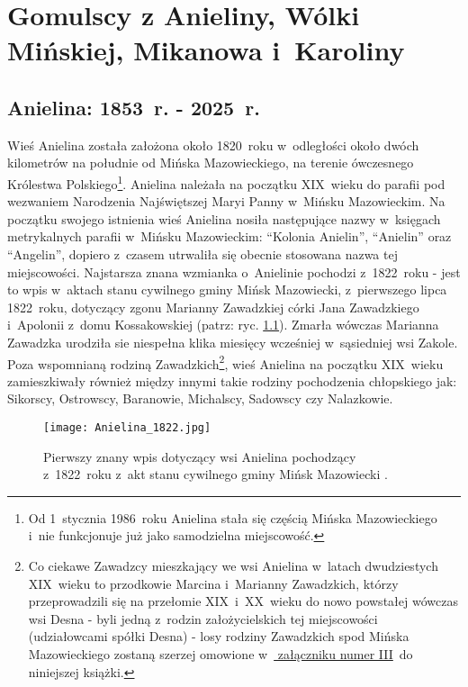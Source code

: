 \chapter{Gomulscy z Anieliny, Wólki Mińskiej, Mikanowa i~Karoliny}



\section{Anielina: 1853~r. - 2025~r.}

Wieś Anielina została założona około 1820~roku w~odległości około dwóch 
kilometrów na południe od Mińska Mazowieckiego, na terenie ówczesnego 
Królestwa Polskiego\footnote{Od 1~stycznia 1986~roku Anielina stała się 
częścią Mińska Mazowieckiego i~nie funkcjonuje już jako samodzielna 
miejscowość.}. Anielina należała na początku XIX~wieku do parafii pod 
wezwaniem Narodzenia Najświętszej Maryi Panny w~Mińsku Mazowieckim. Na 
początku swojego istnienia wieś Anielina nosiła następujące nazwy w~księgach 
metrykalnych parafii w~Mińsku Mazowieckim: \enquote{Kolonia Anielin}, 
\enquote{Anielin} oraz \enquote{Angelin}, dopiero z~czasem utrwaliła się 
obecnie stosowana nazwa tej miejscowości. Najstarsza znana wzmianka 
o~Anielinie pochodzi z~1822~roku - jest to wpis w~aktach stanu cywilnego 
gminy Mińsk Mazowiecki, z~pierwszego lipca 1822~roku, dotyczący zgonu 
Marianny Zawadzkiej córki Jana Zawadzkiego i~Apolonii z~domu Kossakowskiej 
(patrz: ryc. \ref{fig:anielina_1822}). Zmarła wówczas Marianna Zawadzka 
urodziła sie niespełna klika miesięcy wcześniej w~sąsiedniej wsi Zakole. Poza 
wspomnianą rodziną Zawadzkich\footnote{Co ciekawe Zawadzcy mieszkający we wsi 
Anielina w~latach dwudziestych XIX~wieku to przodkowie Marcina i~Marianny 
Zawadzkich, którzy przeprowadzili się na przełomie XIX~i~XX~wieku do nowo 
powstałej wówczas wsi Desna - byli jedną z~rodzin założycielskich tej 
miejscowości (udziałowcami spółki Desna) - losy rodziny Zawadzkich spod 
Mińska Mazowieckiego zostaną szerzej omowione w~\hyperref[sec:zawadzcy]{
załączniku numer III}~do niniejszej książki.}, wieś Anielina na początku 
XIX~wieku zamieszkiwały również między innymi takie rodziny pochodzenia 
chłopskiego jak: Sikorscy, Ostrowscy, Baranowie, Michalscy, Sadowscy czy 
Nalazkowie.

\begin{figure}[!ht]
    \vspace*{0.5cm}
    \centering \texttt{[image: 
        Anielina\_1822.jpg]}
    \captionsetup{format=hang}
    \caption{Pierwszy znany wpis dotyczący wsi Anielina pochodzący 
    z~1822~roku z~akt stanu cywilnego gminy Mińsk Mazowiecki 
    \cite{par_minsk1}.}
    \label{fig:anielina_1822}
\end{figure}

